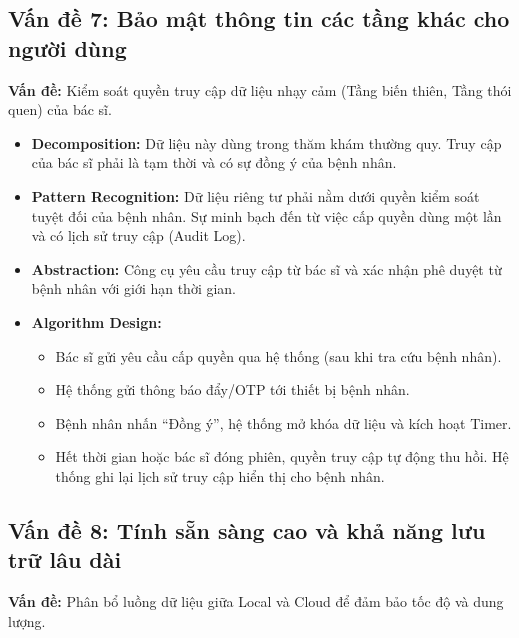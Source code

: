 \documentclass[a4paper,12pt]{article}
\begin{document}
\subsection{Vấn đề 7: Bảo mật thông tin các tầng khác cho người dùng}

\textbf{Vấn đề:} Kiểm soát quyền truy cập dữ liệu nhạy cảm (Tầng biến thiên, Tầng thói quen) của bác sĩ.

\begin{itemize}
    \item \textbf{Decomposition:} Dữ liệu này dùng trong thăm khám thường quy. Truy cập của bác sĩ phải là tạm thời và có sự đồng ý của bệnh nhân.
    \item \textbf{Pattern Recognition:} Dữ liệu riêng tư phải nằm dưới quyền kiểm soát tuyệt đối của bệnh nhân. Sự minh bạch đến từ việc cấp quyền dùng một lần và có lịch sử truy cập (Audit Log).
    \item \textbf{Abstraction:} Công cụ yêu cầu truy cập từ bác sĩ và xác nhận phê duyệt từ bệnh nhân với giới hạn thời gian.
    \item \textbf{Algorithm Design:}
    \begin{itemize}
        \item Bác sĩ gửi yêu cầu cấp quyền qua hệ thống (sau khi tra cứu bệnh nhân).
        \item Hệ thống gửi thông báo đẩy/OTP tới thiết bị bệnh nhân.
        \item Bệnh nhân nhấn ``Đồng ý'', hệ thống mở khóa dữ liệu và kích hoạt Timer.
        \item Hết thời gian hoặc bác sĩ đóng phiên, quyền truy cập tự động thu hồi. Hệ thống ghi lại lịch sử truy cập hiển thị cho bệnh nhân.
    \end{itemize}
\end{itemize}

\subsection{Vấn đề 8: Tính sẵn sàng cao và khả năng lưu trữ lâu dài}

\textbf{Vấn đề:} Phân bổ luồng dữ liệu giữa Local và Cloud để đảm bảo tốc độ và dung lượng.
\end{document}
